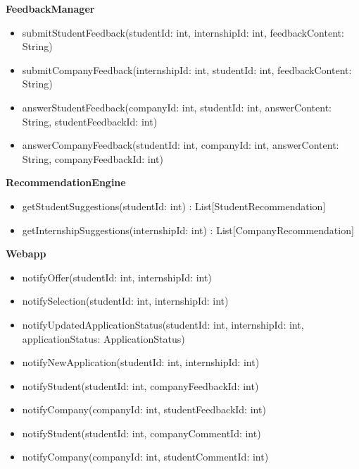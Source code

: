\textbf{FeedbackManager}
\begin{itemize}
    \item submitStudentFeedback(studentId: int, internshipId: int, feedbackContent: String) 
    \item submitCompanyFeedback(internshipId: int, studentId: int, feedbackContent: String)
    \item answerStudentFeedback(companyId: int, studentId: int, answerContent: String, \newline studentFeedbackId: int)
    \item answerCompanyFeedback(studentId: int, companyId: int, answerContent: String, \newline companyFeedbackId: int)
\end{itemize}

\textbf{RecommendationEngine}
\begin{itemize}
    \item getStudentSuggestions(studentId: int) : List[StudentRecommendation]
    \item getInternshipSuggestions(internshipId: int) : List[CompanyRecommendation]
\end{itemize}

\textbf{Webapp}
\begin{itemize}
    \item notifyOffer(studentId: int, internshipId: int) %
    \item notifySelection(studentId: int, internshipId: int) %
    
    \item notifyUpdatedApplicationStatus(studentId: int, internshipId: int, \newline applicationStatus: ApplicationStatus) %
    \item notifyNewApplication(studentId: int, internshipId: int) %
    
    \item notifyStudent(studentId: int, companyFeedbackId: int)
    \item notifyCompany(companyId: int, studentFeedbackId: int)
    \item notifyStudent(studentId: int, companyCommentId: int)
    \item notifyCompany(companyId: int, studentCommentId: int)
\end{itemize}

